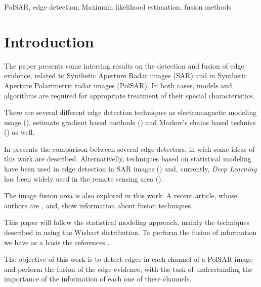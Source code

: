 \documentclass[conference]{IEEEtran}
\begin{document}
\begin{IEEEkeywords}
PolSAR, edge detection, Maximum likelihood estimation, fusion methods
\end{IEEEkeywords}

\section{Introduction}\label{sec_01}

The paper presents some interring results on the detection and fusion of edge evidence, related to Synthetic Aperture Radar images (SAR) and in Synthetic Aperture Polarimetric radar images (PolSAR). In both cases, models and algorithms are required for appropriate treatment of their special characteristics.

There are several different edge detection techniques as electromagnetic modeling usage (\cite{slf_2008}), estimate gradient based methods (\cite{tlb, obw, flmc, fyf}) and Markov's chains based technics (\cite{bf}) as well.

In \cite{gfn} presents the comparison between several edge detectors, in wich some ideas of this work are described. Alternativelly, techniques based on statistical modeling have been used in edge detection in SAR images (\cite{gmbf, fbgm, horrit, gfn}) and, currently, \textit{Deep Learning} has been widely used in the remote sensing area (\cite{bac, ztmxzxf, tabmm, xstz}).

The image fusion area is also explored in this work. A recent article, whose authors are \cite{sglmla}, and, \cite{sg} show  information about fusion techniques. 

This paper will follow the statistical modeling approach, mainly the techniques described in \cite{fbgm, nhfc} using the Wishart distribution. To perform the fusion of information we have as a basis the references \cite{mit, sg}. 

The objective of this work is to detect edges in each channel of a PolSAR image and perform the fusion of the edge evidence, with the task of understanding the importance of the information of each one of these channels. 
\end{document}
